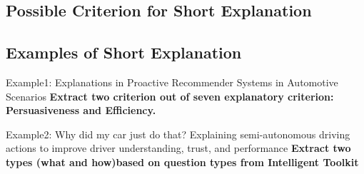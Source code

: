     \subsection{Possible Criterion for Short Explanation}

    \subsection{Examples of Short Explanation}
        Example1: Explanations in Proactive Recommender Systems in Automotive Scenarios \cite{bader122011explanations}
        \textbf{Extract two criterion out of seven explanatory criterion: Persuasiveness and Efficiency.}

        Example2: Why did my car just do that? Explaining semi-autonomous driving actions to improve driver understanding, trust, and performance\cite{koo2015did}
        \textbf{Extract two types (what and how)based on question types from Intelligent Toolkit} \cite{Brian2010toolkit, lim2011design}
